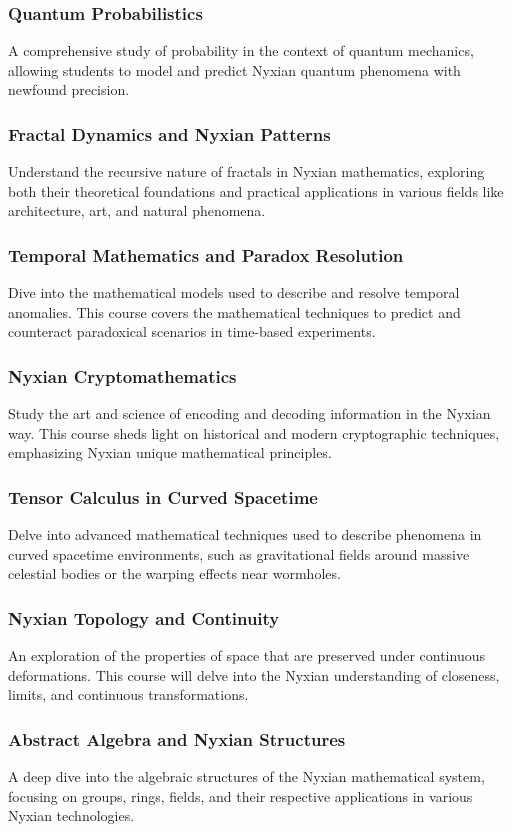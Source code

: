 \subsubsection{Quantum Probabilistics}
A comprehensive study of probability in the context of quantum mechanics, allowing students to model and predict Nyxian quantum phenomena with newfound precision.
\subsubsection{Fractal Dynamics and Nyxian Patterns}
Understand the recursive nature of fractals in Nyxian mathematics, exploring both their theoretical foundations and practical applications in various fields like architecture, art, and natural phenomena.
\subsubsection{Temporal Mathematics and Paradox Resolution}
Dive into the mathematical models used to describe and resolve temporal anomalies. This course covers the mathematical techniques to predict and counteract paradoxical scenarios in time-based experiments.
\subsubsection{Nyxian Cryptomathematics}
Study the art and science of encoding and decoding information in the Nyxian way. This course sheds light on historical and modern cryptographic techniques, emphasizing Nyxian unique mathematical principles.
\subsubsection{Tensor Calculus in Curved Spacetime}
Delve into advanced mathematical techniques used to describe phenomena in curved spacetime environments, such as gravitational fields around massive celestial bodies or the warping effects near wormholes.
\subsubsection{Nyxian Topology and Continuity}
An exploration of the properties of space that are preserved under continuous deformations. This course will delve into the Nyxian understanding of closeness, limits, and continuous transformations.
\subsubsection{Abstract Algebra and Nyxian Structures}
A deep dive into the algebraic structures of the Nyxian mathematical system, focusing on groups, rings, fields, and their respective applications in various Nyxian technologies.
